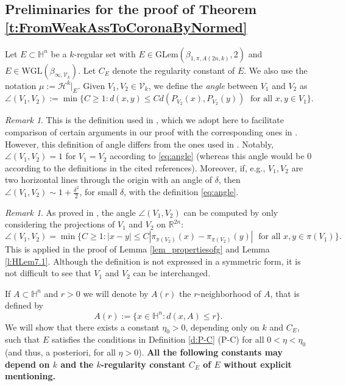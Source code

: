 \documentclass[12pt]{amsart}
\newcommand{\R}{\mathbb R}
\renewcommand{\H}{\mathbb H}
\numberwithin{equation}{section}
\theoremstyle{plain}
\theoremstyle{definition}
\theoremstyle{remark}
\newtheorem{remark}[theorem]{Remark}
\begin{document}
\subsection{Preliminaries for the proof of Theorem \ref{t:FromWeakAssToCoronaByNormed}}\label{ss:PrelimThm}
Let $E\subset\H^n$ be a $k$-regular set with $E\in \mathrm{GLem}(\beta_{1,\pi,A(2n,k)},2)$ and $E\in \mathrm{WGL}(\beta_{\infty,\mathcal{V}_k})$. Let $C_E$ denote the regularity constant of $E$. We also use the notation $\mu:=\mathcal H^k|_E$. Given $V_1,V_2\in\mathcal V_k$, we define the \textit{angle} between $V_1$ and $V_2$ as 
\begin{equation}\label{eq:angle}
\angle(V_1,V_2):=\min\{C\geq 1: d(x,y)\leq Cd(P_{V_2}(x),P_{V_2}(y))\;\text{ for all }x,y\in V_1\}.
\end{equation}
\begin{remark}\label{r:angle}
This is the definition used in \cite[p.4]{Hahlomaa}, which we adopt here to facilitate comparison of certain arguments in our proof with the corresponding ones in \cite{Hahlomaa}. However, this definition of angle differs from the ones used in \cite{David1,David2,FV2}. Notably, $\angle(V_1,V_2)=1$ for $V_1=V_2$ according to \eqref{eq:angle} (whereas this angle would be $0$
 according to the definitions in the cited references). Moreover, if, e.g.,  $V_1,V_2$ are two horizontal lines through the origin with an angle of $\delta$, then  $\angle(V_1,V_2)\sim 1+ \frac{\delta^2}{2}$, for small $\delta$, with the definition \eqref{eq:angle}.%
 \end{remark}
 \begin{remark}
As proved in \cite[Lemma 2.3]{Hahlomaa}, the angle $\angle(V_1,V_2)$ can be computed by only considering the projections of $V_1$ and $V_2$ on $\R^{2n}$:
     \[\angle(V_1,V_2)=\min\{C\geq 1:|x-y|\leq C|\pi_{\pi(V_2)}(x)-\pi_{\pi(V_2)}(y)|\;\text{ for all }x,y\in \pi(V_1)\}.\]
This is applied in the proof of Lemma  \ref{lem_propertiesofg} and Lemma \ref{l:HLem7.1}. Although the definition is not expressed in a symmetric form, it is not difficult to see that $V_1$ and $V_2$ can be interchanged.\end{remark}
If $A\subset\H^n$ and $r>0$ we will denote by $A(r)$ the $r$-neighborhood of $A$, %
that is defined by
\[A(r):=\{x\in\H^n: d(x,A)\leq r\}.\]
We will show that there exists a constant $\eta_0>0$, depending only on $k$ and  $C_E$, such that $E$ satisfies the conditions in Definition \ref{d:P-C} (P-C)
 for all $0<\eta<\eta_0$ (and thus, a posteriori, for all $\eta>0$). 
\textbf{All the following constants may depend on $k$ and the $k$-regularity constant $C_E$ of $E$ without explicit mentioning.}
\end{document}
